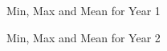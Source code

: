 \label{sec:dataRange}

\begin{figure}[htp]
\centering
{}
\caption{Min, Max and Mean for Year 1 }
\label{fig:y1mmm}
\end{figure}

\begin{figure}[htp]
\centering
{}
\caption{Min, Max and Mean for Year 2 }
\label{fig:y1mmm}
\end{figure}

